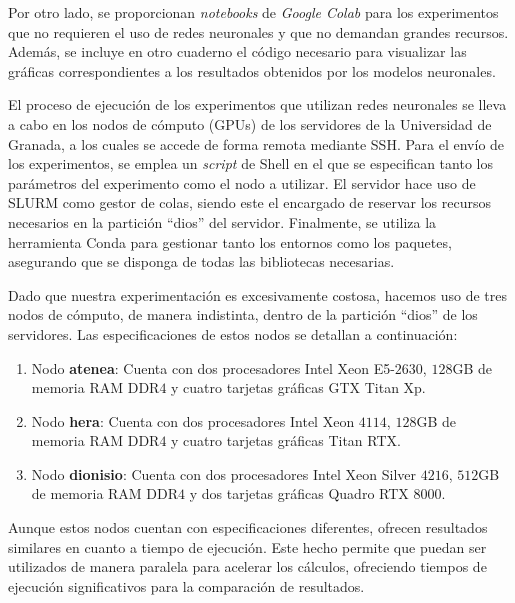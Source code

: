 Por otro lado, se proporcionan \textit{notebooks} de \textit{Google Colab} para los experimentos que no requieren el uso de redes neuronales y que no demandan grandes recursos. Además, se incluye en otro cuaderno el código necesario para visualizar las gráficas correspondientes a los resultados obtenidos por los modelos neuronales.\newline

El proceso de ejecución de los experimentos que utilizan redes neuronales se lleva a cabo en los nodos de cómputo (GPUs) de los servidores de la Universidad de Granada, a los cuales se accede de forma remota mediante SSH. Para el envío de los experimentos, se emplea un \textit{script} de Shell en el que se especifican tanto los parámetros del experimento como el nodo a utilizar. El servidor hace uso de SLURM como gestor de colas, siendo este el encargado de reservar los recursos necesarios en la partición ``dios'' del servidor. Finalmente, se utiliza la herramienta Conda para gestionar tanto los entornos como los paquetes, asegurando que se disponga de todas las bibliotecas necesarias.\newline

Dado que nuestra experimentación es excesivamente costosa, hacemos uso de tres nodos de cómputo, de manera indistinta, dentro de la partición ``dios'' de los servidores. Las especificaciones de estos nodos se detallan a continuación:

\begin{enumerate}
    \item Nodo \textbf{atenea}: Cuenta con dos procesadores Intel Xeon E5-$2630$, $128$GB de memoria RAM DDR$4$ y cuatro tarjetas gráficas GTX Titan Xp.
    \item Nodo \textbf{hera}: Cuenta con dos procesadores Intel Xeon $4114$, $128$GB de memoria RAM DDR$4$ y cuatro tarjetas gráficas Titan RTX.
    \item Nodo \textbf{dionisio}: Cuenta con dos procesadores Intel Xeon Silver $4216$, $512$GB de memoria RAM DDR$4$ y dos tarjetas gráficas Quadro RTX $8000$.
\end{enumerate}

Aunque estos nodos cuentan con especificaciones diferentes, ofrecen resultados similares en cuanto a tiempo de ejecución. Este hecho permite que puedan ser utilizados de manera paralela para acelerar los cálculos, ofreciendo tiempos de ejecución significativos para la comparación de resultados.\newline

